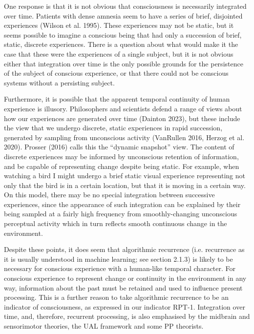 \documentclass[12pt]{article}
\begin{document}
One response is that it is not obvious that consciousness is necessarily integrated over time. Patients with dense amnesia seem to have a series of brief, disjointed experiences (Wilson et al. 1995). These experiences may not be static, but it seems possible to imagine a conscious being that had only a succession of brief, static, discrete experiences. There is a question about what would make it the case that these were the experiences of a single subject, but it is not obvious either that integration over time is the only possible grounds for the persistence of the subject of conscious experience, or that there could not be conscious systems without a persisting subject.

Furthermore, it is possible that the apparent temporal continuity of human experience is illusory. Philosophers and scientists defend a range of views about how our experiences are generated over time (Dainton 2023), but these include the view that we undergo discrete, static experiences in rapid succession, generated by sampling from unconscious activity (VanRullen 2016, Herzog et al. 2020). Prosser (2016) calls this the ``dynamic snapshot'' view. The content of discrete experiences may be informed by unconscious retention of information, and be capable of representing change despite being static. For example, when watching a bird I might undergo a brief static visual experience representing not only that the bird is in a certain location, but that it is moving in a certain way. On this model, there may be no special integration between successive experiences, since the appearance of such integration can be explained by their being sampled at a fairly high frequency from smoothly-changing unconscious perceptual activity which in turn reflects smooth continuous change in the environment.

Despite these points, it does seem that algorithmic recurrence (i.e. recurrence as it is usually understood in machine learning; see section 2.1.3) is likely to be necessary for conscious experience with a human-like temporal character. For conscious experience to represent change or continuity in the environment in any way, information about the past must be retained and used to influence present processing. This is a further reason to take algorithmic recurrence to be an indicator of consciousness, as expressed in our indicator RPT-1. Integration over time, and, therefore, recurrent processing, is also emphasised by the midbrain and sensorimotor theories, the UAL framework and some PP theorists.
\end{document}
